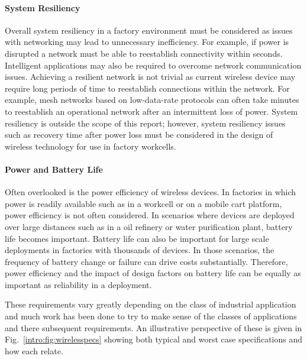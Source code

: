 {\paragraph{System Resiliency}
Overall system resiliency in a factory environment must be considered as issues with networking may lead to unnecessary inefficiency. For example, if power is disrupted a network must be able to reestablish connectivity within seconds. Intelligent applications may also be required to overcome network communication issues. Achieving a resilient network is not trivial as current wireless device may require long periods of time to reestablish connections within the network.  For example, mesh networks based on low-data-rate protocols can often take minutes to reestablish an operational network after an intermittent loss of power.  System resiliency is outside the scope of this report; however, system resiliency issues such as recovery time after power loss must be considered in the design of wireless technology for use in factory workcells.

\paragraph{Power and Battery Life}
Often overlooked is the power efficiency of wireless devices.  In factories in which power is readily available such as in a workcell or on a mobile cart platform, power efficiency is not often considered.  In scenarios where devices are deployed over large distances such as in a oil refinery or water purification plant, battery life becomes important.  Battery life can also be important for large scale deployments in factories with thousands of devices.  In those scenarios, the frequency of battery change or failure can drive costs substantially.  Therefore, power efficiency and the impact of design factors on battery life can be equally as important as reliability in a deployment. 


These requirements vary greatly depending on the class of industrial application and much work has been done to try to make sense of the classes of applications and there subsequent requirements.  An illustrative perspective of these is given in Fig.~\ref{intro:fig:wirelesspecs} showing both typical and worst case specifications and how each relate.  


\begin{figure}[!tbp]
	

\end{figure}}
